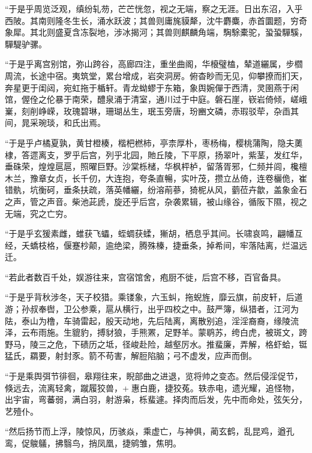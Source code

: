 \documentclass[12pt,UTF8]{ctexbook}
\begin{document}
“于是乎周览泛观，缜纷轧芴，芒芒恍忽，视之无端，察之无涯。日出东沼，入乎西陂。其南则隆冬生长，涌水跃波；其兽则庸旄貘犛，沈牛麝麋，赤首圜题，穷奇象犀。其北则盛夏含冻裂地，涉冰揭河；其兽则麒麟角端，騊駼橐驼，蛩蛩驒騱，驒騠驴骡。



“于是乎离宫别馆，弥山跨谷，高廊四注，重坐曲阁，华榱璧榼，辇道纚属，步櫩周流，长途中宿。夷筑堂，累台增成，岩突洞房。俯杳眇而无见，仰攀撩而扪天，奔星更于闺闼，宛虹拖于楯轩。青龙蚴蟉于东箱，象舆婉僤于西清，灵圉燕于闲馆，偓佺之伦暴于南荣，醴泉涌于清室，通川过于中庭。磐石崖，嵚岩倚倾，嵯峨嶪，刻削峥嵘，玫瑰碧琳，珊瑚丛生，珉玉旁唐，玢豳文磷，赤瑕驳荦，杂臿其间，晁采琬琰，和氏出焉。



“于是乎卢橘夏孰，黄甘橙楱，楷杷橪柿，亭柰厚朴，枣杨梅，樱桃蒲陶，隐夫薁棣，答遝离支，罗乎后宫，列乎北园，貤丘陵，下平原，扬翠叶，紫茎，发红华，垂硃荣，煌煌扈扈，照曜巨野。沙棠栎槠，华枫枰栌，留落胥邪，仁频并闾，欃檀木兰，豫章女贞，长千仞，大连抱，夸条直暢，实叶茂，攒立丛倚，连卷欐佹，崔错骫，坑衡砢，垂条扶疏，落英幡纚，纷溶萷蔘，猗柅从风，藰莅卉歙，盖象金石之声，管之声音。柴池茈虒，旋还乎后宫，杂袭累辑，被山缘谷，循阪下隰，视之无端，究之亡穷。



“于是乎玄猨素雌，蜼获飞蠝，蛭蜩获蝚，獑胡，栖息乎其间。长啸哀鸣，翩幡互经，夭蟜枝格，偃蹇杪颠，逾绝梁，腾殊榛，捷垂条，掉希间，牢落陆离，烂温远迁。



“若此者数百千处，娱游往来，宫宿馆舍，疱厨不徙，后宫不移，百官备具。



“于是乎背秋涉冬，天子校猎。乘镂象，六玉虯，拖蜺旌，靡云旗，前皮轩，后道游；孙叔奉辔，卫公参乘，扈从横行，出乎四校之中。鼓严簿，纵猎者，江河为阹，泰山为橹，车骑雷起，殷天动地，先后陆离，离散别追，淫淫裔裔，缘陵流泽，云布雨施。生貔豹，搏豺狼，手熊罴，足野羊。蒙鹖苏，绔白虎，被斑文，跨野马，陵三之危，下碛历之坻，径峻赴险，越壑厉水。推蜚廉，弄解，格虾蛤，铤猛氏，羂要，射封豕。箭不苟害，解脰陷脑；弓不虚发，应声而倒。



“于是乘舆弭节徘徊，皋翔往来，睨部曲之进退，览将帅之变态。然后侵淫促节，倏远去，流离轻禽，蹴履狡兽，+惠白鹿，捷狡菟。轶赤电，遗光耀，追怪物，出宇宙，弯蕃弱，满白羽，射游枭，栎蜚遽。择肉而后发，先中而命处，弦矢分，艺殪仆。



“然后扬节而上浮，陵惊风，历骇焱，乘虚亡，与神俱，蔺玄鹤，乱昆鸡，遒孔鸾，促鵔鸃，拂翳鸟，捎凤凰，捷鹓雏，焦明。
\end{document}
